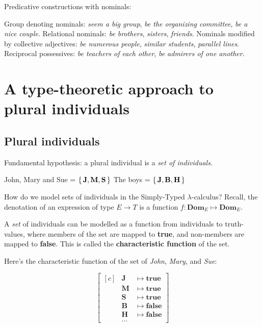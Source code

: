 \documentclass[letterpaper,parskip=half]{scrartcl}
\begin{document}
Predicative constructions with nominals:

\begin{exe}
\ex Group denoting nominals: \emph{seem a big group}, \emph{be the organizing committee}, \emph{be a nice couple}.
\ex Relational nominals: \emph{be brothers}, \emph{sisters}, \emph{friends}.
\ex Nominals modified by collective adjectives: \emph{be numerous people}, \emph{similar students}, \emph{parallel lines}.
\ex Reciprocal possessives: \emph{be teachers of each other}, \emph{be admirers of one another}.
\label{org542b69f}
\end{exe}

\section{A type-theoretic approach to plural individuals}
\label{sec:orgd069a5c}

\subsection{Plural individuals}
\label{sec:orgf1fe5d5}

Fundamental hypothesis: a plural individual is a \emph{set of individuals}.

\begin{exe}
\ex John, Mary and Sue = \(\set{\mathbf{J}, \mathbf{M}, \mathbf{S}}\)
\ex The boys = \(\set{\mathbf{J},\mathbf{B},\mathbf{H}}\)
\label{orgc3db457}
\end{exe}

How do we model sets of individuals in the Simply-Typed \(\lambda\)-calculus? Recall, the denotation of an expression of type \(E \to T\) is a function \(f:\mathbf{Dom}_E \mapsto \mathbf{Dom}_E\).

A \emph{set} of individuals can be modelled as a function from individuals to truth-values, where members of the set are mapped to \textbf{true}, and non-members are mapped to \textbf{false}. This is called the \textbf{characteristic function} of the set.

Here's the characteristic function of the set of \emph{John}, \emph{Mary}, and \emph{Sue}:

\[\left[\begin{aligned}[c]
&\mathbf{J} &\mapsto \mathbf{true}\\
&\mathbf{M} &\mapsto \mathbf{true}\\
&\mathbf{S} &\mapsto \mathbf{true}\\
&\mathbf{B} &\mapsto \mathbf{false}\\
&\mathbf{H} &\mapsto \mathbf{false}\\
&\ldots
\end{aligned}\right]\]
\end{document}
